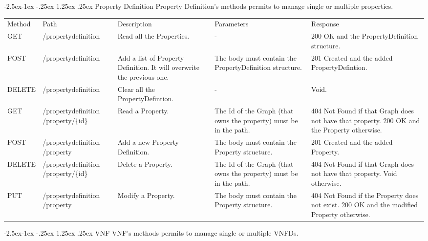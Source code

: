 \documentclass[11pt, english]{article}
\makeatletter
\renewcommand\paragraph{\@startsection{paragraph}{4}{\z@}%
            {-2.5ex\@plus -1ex \@minus -.25ex}%
            {1.25ex \@plus .25ex}%
            {\normalfont\normalsize\bfseries}}
\makeatother
\begin{document}
\newpage
\paragraph{Property Definition}
Property Definition's methods permits to manage single or multiple properties. \\

\begin{tabular}{ |p{2cm}|m{3cm}|p{3cm}|p{3cm}|p{4cm}| }
    \hline
    \rowcolor{black} \multicolumn{5}{|c|}{\textcolor{white}{PropertyDefinition}} \\
    \hline
    \rowcolor{Gray}
    Method & Path & Description & Parameters & Response \\
    \hline
    GET   & /propertydefinition & Read all the Properties. & - & 200 OK and the PropertyDefinition structure. \\
    \hline
    POST & /propertydefinition & Add a list of Property Definition. It will overwrite the previous one. & The body must contain the PropertyDefinition structure. & 201 Created and the added PropertyDefintion. \\
    \hline
    DELETE & /propertydefinition & Clear all the PropertyDefintion. & - & Void. \\
    \hline
    GET   & /propertydefinition /property/\{id\} & Read a Property. & The Id of the Graph (that owns the property) must be in the path. & 404 Not Found if that Graph does not have that property. 200 OK and the Property otherwise. \\
    \hline
    POST & /propertydefinition /property & Add a new Property Definition. & The body must contain the Property structure. & 201 Created and the added Property. \\
    \hline
    DELETE & /propertydefinition /property/\{id\} & Delete a Property. & The Id of the Graph (that owns the property) must be in the path. & 404 Not Found if that Graph does not have that property. Void otherwise. \\
    \hline
    PUT & /propertydefinition /property & Modify a Property. & The body must contain the Property structure. & 404 Not Found if the Property does not exist. 200 OK and the modified Property otherwise. \\
    \hline
\end{tabular}

\newpage
\paragraph{VNF}
VNF's methods permits to manage single or multiple VNFDs. \\
\end{document}
